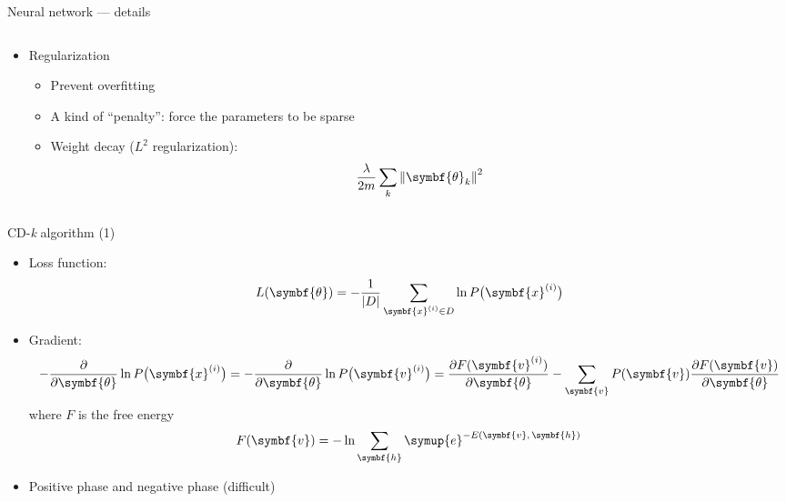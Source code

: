\documentclass[aspectratio=169]{beamer}
\def\ee{{\symup{e}}}
\def\domD{D}
\def\bm#1{{\symbf{#1}}}
\begin{document}
\begin{frame}{Neural network --- details}
\begin{columns}[t]
  \begin{column}{0.48\textwidth}
    \begin{itemize}
      \item Regularization
        \begin{itemize}
          \item Prevent overfitting
          \item A kind of ``penalty'': force the parameters to be sparse
          \item Weight decay ($L^2$ reg\-u\-lar\-iza\-tion):
            \[ \frac{\lambda}{2m} \sum_k \norm{\bm{\theta}_k}^2 \]
        \end{itemize}
    \end{itemize}
  \end{column}
\end{columns}
\end{frame}

\begin{frame}{CD-\textit{k} algorithm (1)}
\begin{itemize}
  \item Loss function:
    \[
      L(\bm{\theta})
      = - \frac{1}{\abs{\domD}} \sum_{\bm{x}^{(i)}\in\domD} \ln P\qty\big(\bm{x}^{(i)})
    \]
  \item Gradient:
    \[
        - \pdv{\bm{\theta}} \ln P\qty\big(\bm{x}^{(i)})
      = - \pdv{\bm{\theta}} \ln P\qty\big(\bm{v}^{(i)})
      = \pdv{F(\bm{v}^{(i)})}{\bm{\theta}}
      - \sum_{\bm{v}} P(\bm{v}) \pdv{F(\bm{v})}{\bm{\theta}}
    \]
    where $F$ is the free energy
    \[ F(\bm{v}) = - \ln \sum_{\bm{h}} \ee^{-E(\bm{v},\,\bm{h})} \]
  \item Positive phase and negative phase (difficult)
\end{itemize}
\end{frame}
\end{document}
